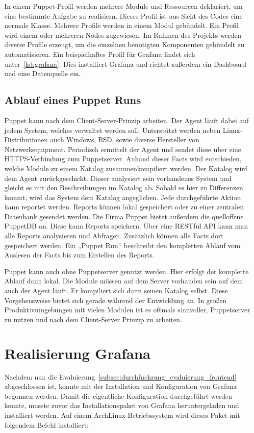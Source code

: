 In einem Puppet-Profil werden mehrere Module und Ressourcen deklariert, um eine
bestimmte Aufgabe zu realisiern. Dieses Profil ist aus Sicht des Codes eine
normale Klasse. Mehrere Profile werden in einem Modul gebündelt. Ein Profil
wird einem oder mehreren Nodes zugewiesen. Im Rahmen des Projekts werden
diverse Profile erzeugt, um die einzelnen benötigten Komponenten gebündelt zu
automatisieren. Ein beispielhaftes Profil für Grafana findet sich
unter~\ref{lst:grafana}. Dies installiert Grafana und richtet außerdem ein
Dashboard und eine Datenquelle ein.
\tm%

\subsection{Ablauf eines Puppet Runs}
Puppet kann nach dem \gls{Client-Server}-Prinzip arbeiten. Der Agent läuft
dabei auf jedem System, welches verwaltet werden soll. Unterstützt werden neben
Linux-Distributionen auch Windows, BSD, sowie diverse Hersteller von
Netzwerkequipment. Periodisch ermittelt der Agent  und
sendet diese über eine \gls{HTTPS}-Verbindung zum Puppetserver. Anhand dieser
Facts wird entschieden, welche Module zu einem Katalog zusammenkompiliert
werden. Der Katalog wird dem Agent zurückgeschickt. Dieser analysiert sein
vorhandenes System und gleicht es mit den Beschreibungen im Katalog ab. Sobald
es hier zu Differenzen kommt, wird das System dem Katalog angeglichen. Jede
durchgeführte Aktion kann reportet werden. Reports können lokal gespeichert
oder zu einer zentralen Datenbank gesendet werden. Die Firma Puppet bietet
außerdem die quelloffene PuppetDB an. Diese kann Reports speichern. Über eine
\gls{RESTful} API kann man alle Reports analysieren und Abfragen. Zusätzlich
können alle Facts dort gespeichert werden. Ein „Puppet Run“ beschreibt den
kompletten Ablauf vom Auslesen der Facts bis zum Erstellen des Reports.

Puppet kann auch ohne Puppetserver genutzt werden. Hier erfolgt der komplette
Ablauf dann lokal. Die Module müssen auf dem Server vorhanden sein auf dem
auch der Agent läuft. Er kompiliert sich dann seinen Katalog selbst. Diese
Vorgehensweise bietet sich gerade während der Entwicklung an. In großen
Produktivumgebungen mit vielen Modulen ist es oftmals sinnvoller, Puppetserver
zu nutzen und nach dem Client-Server Prinzip zu arbeiten.
\tm%

\section{Realisierung Grafana}
\label{sec:realisierung_Grafana}
Nachdem nun die Evaluierung~\ref{subsec:durchfuehrung_evaluierung_frontend}
abgeschlossen ist, konnte mit der Installation und Konfiguration von Grafana
begonnen werden. Damit die eigentliche Konfiguration durchgeführt werden
konnte, musste zuvor das Installationspaket von Grafana heruntergeladen und
installiert werden. Auf einem ArchLinux-Betriebssystem wird dieses Paket mit
folgendem Befehl installiert:

